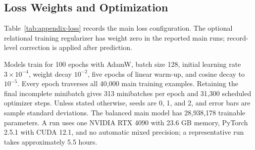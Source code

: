 \subsection{Loss Weights and Optimization}

\begin{table}[t]
\centering
\caption{Loss configuration used for the main model.}
\label{tab:appendix-loss}
\scriptsize
\setlength{\tabcolsep}{2pt}
\end{table}

Table~\ref{tab:appendix-loss} records the main loss configuration. The optional relational training
regularizer has weight zero in the reported main runs; record-level correction is applied after
prediction.

Models train for 100 epochs with AdamW, batch size 128, initial learning rate $3\times10^{-4}$,
weight decay $10^{-2}$, five epochs of linear warm-up, and cosine decay to $10^{-5}$. Every epoch
traverses all 40,000 main training examples. Retaining the final incomplete minibatch gives 313
minibatches per epoch and 31,300 scheduled optimizer steps. Unless stated otherwise, seeds are 0, 1,
and 2, and error bars are sample standard deviations. The balanced main model has 28,938,178
trainable parameters. A run uses one NVIDIA RTX 4090 with 23.6 GB memory, PyTorch 2.5.1 with
CUDA 12.1, and no automatic mixed precision; a representative run takes approximately 5.5 hours.

